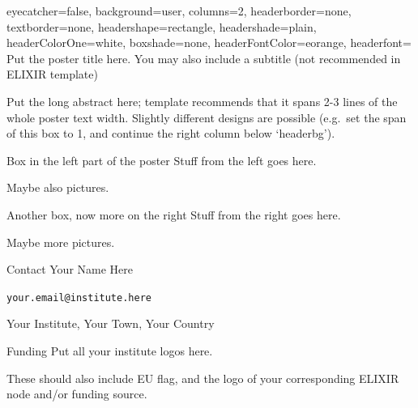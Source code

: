 \documentclass[portrait,a0paper,fontscale=0.30]{baposter}
\begin{document}
\begin{poster}{%
  eyecatcher=false,
  background=user,
  columns=2,
  headerborder=none,
  textborder=none,
  headershape=rectangle,
  headershade=plain,
  headerColorOne=white,
  boxshade=none,
  headerFontColor=eorange,
  headerfont=\Large
  }{}%
  {\vspace{2em} \color{white} \fontsize{32pt}{32pt}\selectfont
  Put the poster title here. %
  }%
  {\color{white}
  You may also include a subtitle (not recommended in ELIXIR template)
  }{}


%
%
%

\begin{posterbox}[name=abstract, column=0, span=2, below=headerbg]{}
Put the long abstract here; template recommends that it spans 2-3 lines of the whole poster text width. Slightly different designs are possible (e.g.~set the span of this box to 1, and continue the right column below `headerbg').
\end{posterbox}

\begin{posterbox}[name=boxleft, below=abstract, column=0]{Box in the left part of the poster}
Stuff from the left goes here.

Maybe also pictures.
\end{posterbox}
\begin{posterbox}[name=boxright, below=abstract, column=1]{Another box, now more on the right}
Stuff from the right goes here.

Maybe more pictures.
\end{posterbox}

%
%
%

\begin{posterbox}[name=footer, below=footersep, column=0]{Contact}
Your Name Here %

\texttt{your.email@institute.here}

Your Institute, Your Town, Your Country
\end{posterbox}

\begin{posterbox}[name=funding, below=footersep, column=1]{Funding}
Put all your institute logos here.

These should also include EU flag, and the logo of your corresponding ELIXIR node and/or funding source.
\end{posterbox}

\end{poster}
\end{document}
